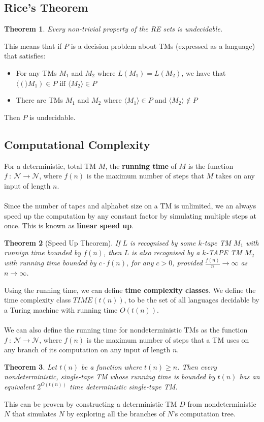 \documentclass{article}
\newtheorem{thm}{Theorem}
\newcommand{\encode}[1]{\langle #1 \rangle}
\begin{document}
    \subsection{Rice's Theorem}
        \begin{thm}
            Every non-trivial property of the RE sets is undecidable.
        \end{thm}
        This means that if $P$ is a decision problem about TMs (expressed as a language) that satisfies:
        \begin{itemize}
            \item For any TMs $M_1$ and $M_2$ where $L(M_1) = L(M_2)$, we have that $\encode(M_1) \in P$ iff $\encode{M_2} \in P$
            \item There are TMs $M_1$ and $M_2$ where $\encode{M_1} \in P$ and $\encode{M_2} \notin P$
        \end{itemize}
        Then $P$ is undecidable.
    \subsection{Computational Complexity}
        For a deterministic, total TM $M$, the \textbf{running time} of $M$ is the function $f \ : \ \mathcal{N} \to \mathcal{N}$, where $f(n)$ is the maximum number of steps that $M$ takes on any input of length $n$.\\ \\
        Since the number of tapes and alphabet size on a TM is unlimited, we an always speed up the computation by any constant factor by simulating multiple steps at once. This is known as \textbf{linear speed up}. 
        \begin{thm}[Speed Up Theorem]
            If $L$ is recognised by some $k$-tape TM $M_1$ with runnign time bounded by $f(n)$, then $L$ is also recognised by a $k$-TAPE TM $M_2$ with running time bounded by $c \cdot f(n)$, for any $c > 0$, provided $\frac{f(n)}{n} \to \infty$ as $n \to \infty$.
        \end{thm}
        Using the running time, we can define \textbf{time complexity classes}. We define the time complexity class $TIME(t(n))$, to be the set of all languages decidable by a Turing machine with running time $O(t(n))$.\\ \\
        We can also define the running time for nondeterministic TMs as the function $f \ : \ \mathcal{N} \to \mathcal{N}$, where $f(n)$ is the maximum number of steps that a TM uses on any branch of its computation on any input of length $n$. 
        \begin{thm}
            Let $t(n)$ be a function  where $t(n) \geq n$. Then every nondeterministic, single-tape TM whose running time is bounded by $t(n)$ has an equivalent $2^{O(t(n))}$ time deterministic single-tape TM. 
        \end{thm}
        This can be proven by constructing a deterministic TM $D$ from nondeterministic $N$ that simulates $N$ by exploring all the branches of $N$'s computation tree. 
\end{document}
